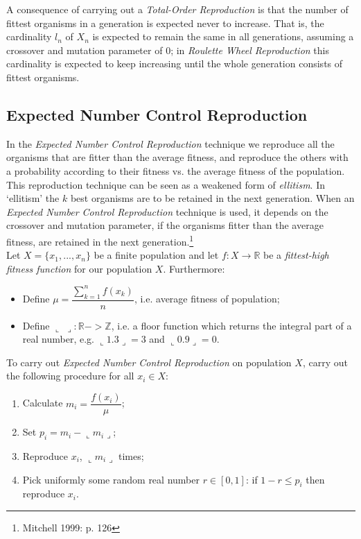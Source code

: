 \documentclass[a4paper]{article}
\newcommand{\fl}{\llcorner}
\newcommand{\fr}{\lrcorner}
\theoremstyle{dotless}
\begin{document}
A consequence of carrying out a \emph{Total-Order Reproduction} is that the number of fittest organisms in a generation is expected never to increase. That is, the cardinality $l_n$ of $X_n$ is expected to remain the same in all generations, assuming a crossover and mutation parameter of 0; in \emph{Roulette Wheel Reproduction} this cardinality is expected to keep increasing until the whole generation consists of fittest organisms.

\subsection{Expected Number Control Reproduction}

In the \emph{Expected Number Control Reproduction} technique we reproduce all the organisms that are fitter than the average fitness, and reproduce the others with a probability according to their fitness vs. the average fitness of the population. This reproduction technique can be seen as a weakened form of \emph{ellitism}. In `ellitism' the $k$ best organisms are to be retained in the next generation. When an \emph{Expected Number Control Reproduction} technique is used, it depends on the crossover and mutation parameter, if the organisms fitter than the average fitness, are retained in the next generation.\footnote{Mitchell 1999: p. 126}\\


Let $X = \{x_1,...,x_n \}$ be a finite population and let $f: X \rightarrow \mathbb{R}$ be a \emph{fittest-high fitness function} for our population $X$. Furthermore:

\begin{itemize}
\item Define $\mu = \dfrac{\sum^n_{k=1} f(x_k)}{n}$, i.e. average fitness of population;
\item Define $\llcorner \; \lrcorner: \mathbb{R} -> \mathbb{Z}$, i.e. a floor function which returns the integral part of a real number, e.g. $\fl 1.3 \fr = 3$ and $\fl 0.9 \fr = 0$.
\end{itemize}

To carry out \emph{Expected Number Control Reproduction} on population $X$, carry out the following procedure for all $x_i \in X$:\newpage

	\begin{enumerate}
	\item Calculate $m_i = \dfrac{f(x_i)}{\mu}$;
	\item Set $p_i = m_i - \fl m_i \fr$;
	\item Reproduce $x_i$, $\fl m_i \fr$ times;
	\item Pick uniformly some random real number $r \in [0,1]$: if $1 - r \leq p_i$ then reproduce $x_i$.
	\end{enumerate}
	
\end{document}
